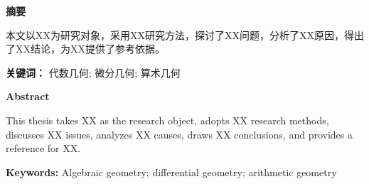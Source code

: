 \documentclass[12pt,a4paper,UTF8]{ctexart}
\renewcommand{\heiti}{\myheiti}
\begin{document}
\pagestyle{empty} %

 

\newpage


\newpage

\begin{center}
\textbf{\Large\heiti 摘要}
\end{center}
\singlespacing
\setlength{\baselineskip}{20pt} %
\normalsize %
\hspace{2em}本文以XX为研究对象，采用XX研究方法，探讨了XX问题，分析了XX原因，得出了XX结论，为XX提供了参考依据。\par
\vspace{1em}
\noindent\textbf{\heiti 关键词：}
\normalsize 代数几何; 微分几何; 算术几何

\quad 


\newpage

\begin{center}
\textbf{\Large Abstract}
\end{center}
\singlespacing
\setlength{\baselineskip}{20pt} %
\normalsize
\hspace{2em}This thesis takes XX as the research object, adopts XX research methods, discusses XX issues, analyzes XX causes, draws XX conclusions, and provides a reference for XX.\par
\vspace{1em}
\noindent\textbf{Keywords:} Algebraic geometry; differential geometry; arithmetic geometry
\vspace{2em}
\newpage


\singlespacing
\setlength{\baselineskip}{20pt} %

\vspace{1em}
\tableofcontents
\vspace{2em}
\newpage
\end{document}

